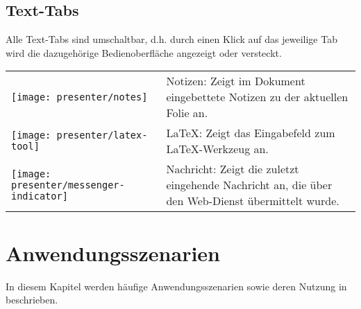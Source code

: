 \subsection{Text-Tabs}
Alle Text-Tabs sind umschaltbar, d.h. durch einen Klick auf das jeweilige Tab wird die dazugehörige Bedienoberfläche angezeigt oder versteckt.

\begin{longtable}{p{1cm}p{12cm}}
	\begin{minipage}{.05\textwidth}
		\texttt{[image: presenter/notes]}
	\end{minipage}
	& Notizen: Zeigt im Dokument eingebettete Notizen zu der aktuellen Folie an. \\
	\begin{minipage}{.05\textwidth}
		\texttt{[image: presenter/latex-tool]}
	\end{minipage}
	& LaTeX: Zeigt das Eingabefeld zum LaTeX-Werkzeug an. \\
	\begin{minipage}{.05\textwidth}
		\texttt{[image: presenter/messenger-indicator]}
	\end{minipage}
	& Nachricht: Zeigt die zuletzt eingehende Nachricht an, die über den Web-Dienst übermittelt wurde.
\end{longtable}

\section{Anwendungsszenarien}
\label{section:presenter-use-cases}
In diesem Kapitel werden häufige Anwendungsszenarien sowie deren Nutzung in \lectPresenter{} beschrieben.



